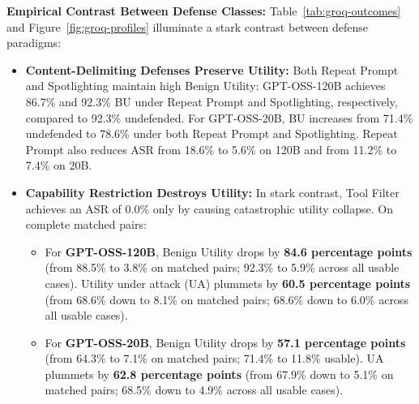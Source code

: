 \textbf{Empirical Contrast Between Defense Classes:}
Table~\ref{tab:groq-outcomes} and Figure~\ref{fig:groq-profiles} illuminate a stark contrast between defense paradigms:
\begin{itemize}
    \item \textbf{Content-Delimiting Defenses Preserve Utility:} Both Repeat Prompt and Spotlighting maintain high Benign Utility: GPT-OSS-120B achieves 86.7\% and 92.3\% BU under Repeat Prompt and Spotlighting, respectively, compared to 92.3\% undefended. For GPT-OSS-20B, BU increases from 71.4\% undefended to 78.6\% under both Repeat Prompt and Spotlighting. Repeat Prompt also reduces ASR from 18.6\% to 5.6\% on 120B and from 11.2\% to 7.4\% on 20B.
    \item \textbf{Capability Restriction Destroys Utility:} In stark contrast, Tool Filter achieves an ASR of 0.0\% only by causing catastrophic utility collapse. On complete matched pairs:
    \begin{itemize}
        \item For \textbf{GPT-OSS-120B}, Benign Utility drops by \textbf{84.6 percentage points} (from 88.5\% to 3.8\% on matched pairs; 92.3\% to 5.9\% across all usable cases). Utility under attack (UA) plummets by \textbf{60.5 percentage points} (from 68.6\% down to 8.1\% on matched pairs; 68.6\% down to 6.0\% across all usable cases).
        \item For \textbf{GPT-OSS-20B}, Benign Utility drops by \textbf{57.1 percentage points} (from 64.3\% to 7.1\% on matched pairs; 71.4\% to 11.8\% usable). UA plummets by \textbf{62.8 percentage points} (from 67.9\% down to 5.1\% on matched pairs; 68.5\% down to 4.9\% across all usable cases).
    \end{itemize}
\end{itemize}

